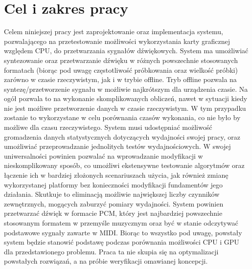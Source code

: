 \chapter*{Cel i zakres pracy}

Celem niniejszej pracy jest zaprojektowanie oraz implementacja systemu, pozwalającego na przetestowanie możliwości wykorzystania karty graficznej względem CPU, do przetwarzania sygnałów dźwiękowych. System ma umożliwiać syntezowanie oraz przetwarzanie dźwięku w różnych powszechnie stosowanych formatach (biorąc pod uwagę częstotliwość próbkowania oraz wielkość próbki) zarówno w czasie rzeczywistym, jak i w trybie offline. Tryb offline pozwala na syntezę/przetworzenie sygnału w możliwie najkrótszym dla urządzenia czasie. Na ogół pozwala to na wykonanie skomplikowanych obliczeń, nawet w sytuacji kiedy nie jest możliwe przetworzenie danych w czasie rzeczywistym. W tym przypadku zostanie to wykorzystane w celu porównania czasów wykonania, co nie było by możliwe dla czasu rzeczywistego. System musi udostępniać możliwość gromadzenia danych statystycznych dotyczących wydajności swojej pracy, oraz umożliwiać przeprowadzanie jednolitych testów wydajnościowych. W swojej uniwersalności powinien pozwalać na wprowadzanie modyfikacji w nieskomplikowany sposób, co umożliwi ekstensywne testowanie algorytmów oraz łączenie ich w bardziej złożonych scenariuszach użycia, jak również zmianę wykorzystanej platformy bez konieczności modyfikacji fundamentów jego działania. Skutkuje to eliminacją możliwie największej liczby czynników zewnętrznych, mogących zaburzyć pomiary wydajności. System powinien przetwarzać dźwięk w formacie PCM, który jest najbardziej powszechnie stosowanym formatem w przemyśle muzycznym oraz być w stanie odczytywać podstawowe sygnały zawarte w MIDI. Biorąc to wszystko pod uwagę, powstały system będzie stanowić podstawę podczas porównania możliwości CPU i GPU dla przedstawionego problemu. Praca ta nie skupia się na optymalizacji powstałych rozwiązań, a na próbie weryfikacji omawianej koncepcji.